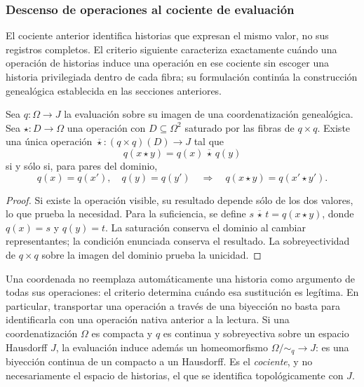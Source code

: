 \subsubsection{Descenso de operaciones al cociente de evaluación}
\label{sec:ch-descenso-fibras}

El cociente anterior identifica historias que expresan el mismo valor, no
sus registros completos. El criterio siguiente caracteriza exactamente
cuándo una operación de historias induce una operación en ese cociente sin
escoger una historia privilegiada dentro de cada fibra; su formulación
continúa la construcción genealógica establecida en las secciones anteriores.

\begin{proposition}
\label{prop:ch-descenso-fibras}
Sea \(q:\Omega\to J\) la evaluación sobre su imagen de una coordenatización
genealógica. Sea \(\star:D\to\Omega\) una operación con
\(D\subseteq\Omega^2\) saturado por las fibras de \(q\times q\).
Existe una única operación
\(\overline\star:(q\times q)(D)\to J\) tal que
\[
 q(x\star y)=q(x)\,\overline\star\,q(y)
\]
si y sólo si, para pares del dominio,
\[
 q(x)=q(x'),\quad q(y)=q(y')
 \quad\Longrightarrow\quad q(x\star y)=q(x'\star y').
\]
\end{proposition}

\begin{proof}
Si existe la operación visible, su resultado depende sólo de los dos
valores, lo que prueba la necesidad. Para la suficiencia, se define
\(s\,\overline\star\,t=q(x\star y)\), donde \(q(x)=s\) y
\(q(y)=t\). La saturación conserva el dominio al cambiar representantes;
la condición enunciada conserva el resultado. La sobreyectividad de
\(q\times q\) sobre la imagen del dominio prueba la unicidad.
\end{proof}

Una coordenada no reemplaza automáticamente una historia como argumento de
todas sus operaciones: el criterio determina cuándo esa sustitución es
legítima. En particular, transportar una operación a través de una biyección
no basta para identificarla con una operación nativa anterior a la lectura.
Si una coordenatización \(\Omega\) es compacta y \(q\) es continua y sobreyectiva
sobre un espacio Hausdorff \(J\), la evaluación induce además un
homeomorfismo \(\Omega/{\sim_q}\to J\): es una biyección continua de un
compacto a un Hausdorff. Es el \emph{cociente}, y no necesariamente el
espacio de historias, el que se identifica topológicamente con \(J\).
